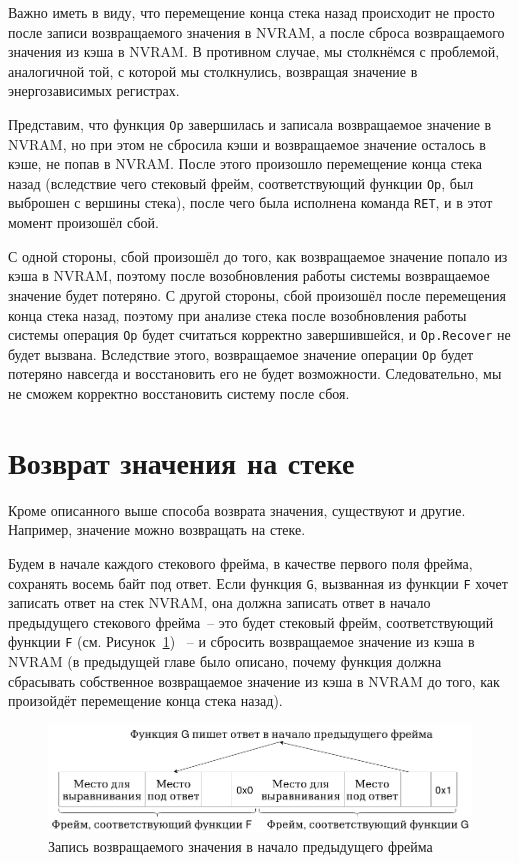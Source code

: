 \documentclass[times,specification,annotation]{itmo-student-thesis}
\begin{document}
\bigbreak

Важно иметь в виду, что перемещение конца стека назад происходит не просто после записи возвращаемого значения в NVRAM, а после сброса возвращаемого значения из кэша в NVRAM. В противном случае, мы столкнёмся с проблемой, аналогичной той, с которой мы столкнулись, возвращая значение в энергозависимых регистрах.

Представим, что функция \texttt{Op} завершилась и записала возвращаемое значение в NVRAM, но при этом не сбросила кэши и возвращаемое значение осталось в кэше, не попав в NVRAM. После этого произошло перемещение конца стека назад (вследствие чего стековый фрейм, соответствующий функции \texttt{Op}, был выброшен с вершины стека), после чего была исполнена команда \texttt{RET}, и в этот момент произошёл сбой.

С одной стороны, сбой произошёл до того, как возвращаемое значение попало из кэша в NVRAM, поэтому после возобновления работы системы возвращаемое значение будет потеряно. С другой стороны, сбой произошёл после перемещения конца стека назад, поэтому при анализе стека после возобновления работы системы операция \texttt{Op} будет считаться корректно завершившейся, и \texttt{Op.Recover} не будет вызвана. Вследствие этого, возвращаемое значение операции \texttt{Op} будет потеряно навсегда и восстановить его не будет возможности. Следовательно, мы не сможем корректно восстановить систему после сбоя.

\section{Возврат значения на стеке}
\label{return-value-stack}

Кроме описанного выше способа возврата значения, существуют и другие. Например, значение можно возвращать на стеке.

Будем в начале каждого стекового фрейма, в качестве первого поля фрейма, сохранять восемь байт под ответ. Если функция \texttt{G}, вызванная из функции \texttt{F} хочет записать ответ на стек NVRAM, она должна записать ответ в начало предыдущего стекового фрейма~-- это будет стековый фрейм, соответствующий функции \texttt{F} (см. Рисунок~\ref{write-answer-pic}) ~-- и сбросить возвращаемое значение из кэша в NVRAM (в предыдущей главе было описано, почему функция должна сбрасывать собственное возвращаемое значение из кэша в NVRAM до того, как произойдёт перемещение конца стека назад). 

\begin{figure}[H]
  \centering
  \caption{Запись возвращаемого значения в начало предыдущего фрейма}
  \label{write-answer-pic}
  \includegraphics[width=\linewidth]{write_answer.png}
\end{figure}
\end{document}
